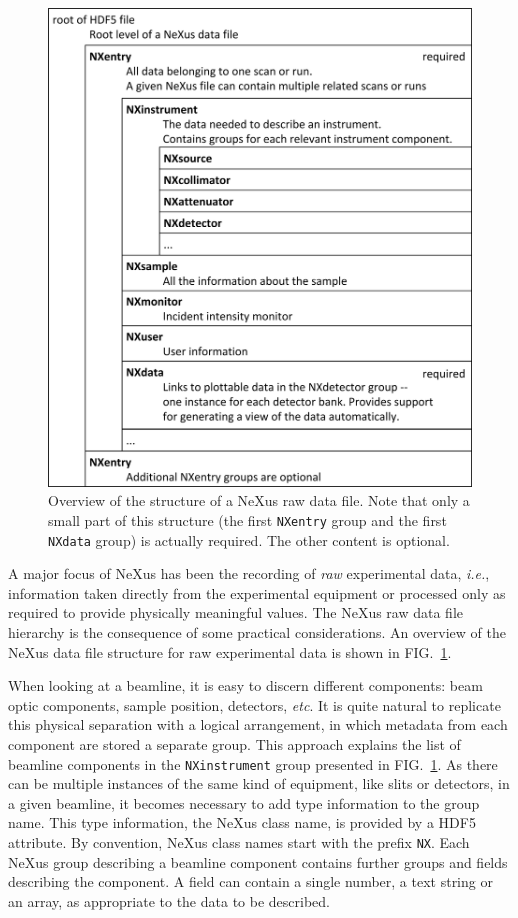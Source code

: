 \documentclass[%
 aip,
rsi,
 amsmath,amssymb,
 reprint,%
]{revtex4-1}
\begin{document}
\begin{figure}
\includegraphics[width=\columnwidth]{figure1}
\caption{\label{rawfile}Overview of the structure of a NeXus raw data file. Note that only a small part of this structure (the first \texttt{NXentry} group and the first \texttt{NXdata} group) is actually required.  The other content is optional.
}
\end{figure}

A major focus of NeXus has been the recording of \emph{raw} experimental data, \emph{i.e.}, information taken directly from the experimental 
equipment or processed only as required to provide physically meaningful values.
The NeXus raw data file hierarchy is the consequence of some practical considerations. 
An overview of the NeXus data file structure for raw experimental data is shown in FIG.~\ref{rawfile}.


When looking at a beamline, it is easy to 
discern different components: beam optic components, sample position, detectors, \emph{etc}. It is quite natural to replicate this physical 
separation with a logical arrangement, in which metadata from each component are stored a separate group. This approach explains the 
list of beamline components in the \texttt{NXinstrument} group presented in FIG.~\ref{rawfile}. 
As there can be multiple instances of the same kind of equipment, like slits or detectors, in a given beamline, it becomes necessary
to add type information to the group name. This type information, the NeXus class name, is provided by a HDF5 attribute.
By convention, NeXus class names start 
with the prefix \texttt{NX}. Each NeXus group describing a beamline component contains further groups and fields describing the component. 
A field can contain a single number, a text string or an array, as appropriate to the data to be described.  
\end{document}
